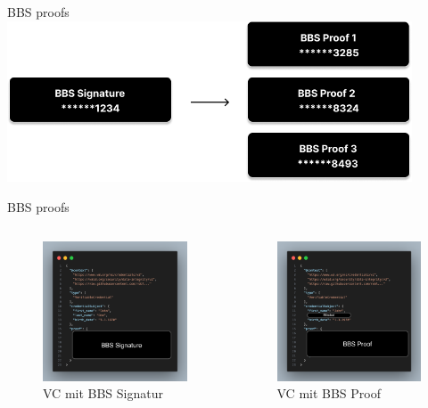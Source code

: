 \documentclass[
	german,%
	authorontitle=true,
	]{bfhbeamer}
\begin{document}
\begin{frame}{BBS proofs}
    \centering
    \includegraphics[width=120mm]{../img/BBSProofGen.png}
\end{frame}

\begin{frame}{BBS proofs}
    \begin{columns}[onlytextwidth,T]
        \column{70mm}  
        \begin{figure}
            \centering
            \includegraphics[width=60mm]{../img/VCSignBlock.png}
            \caption{VC mit BBS Signatur}
        \end{figure}

        \column{70mm}

        \begin{figure}
            \centering
            \includegraphics[width=60mm]{../img/VCProofBlock.png}
            \caption{VC mit BBS Proof}
        \end{figure}

    \end{columns}
\end{frame}
\end{document}
